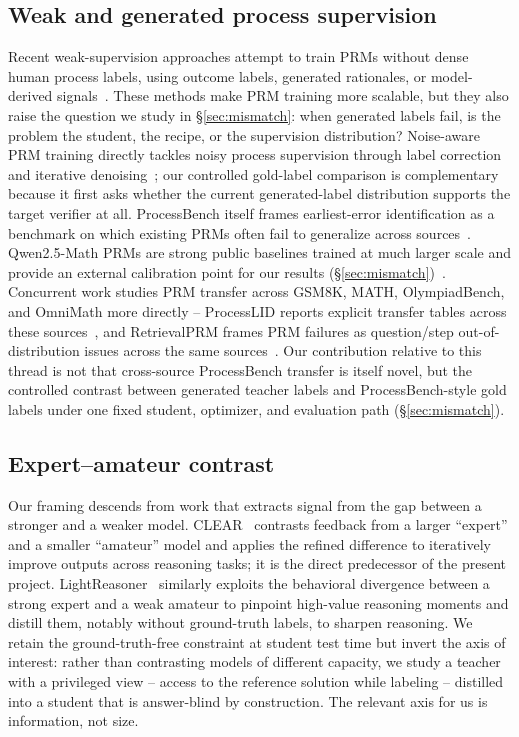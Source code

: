 \documentclass[11pt]{article}
\begin{document}
\subsection{Weak and generated process supervision}
\label{sec:related-weak}
Recent weak-supervision approaches attempt to train PRMs without dense human
process labels, using outcome labels, generated rationales, or model-derived
signals~\cite{sun2025freeprm}. These methods make PRM training more
scalable, but they also raise the question we study in
\S\ref{sec:mismatch}: when generated labels fail, is the problem the
student, the recipe, or the supervision distribution? Noise-aware PRM
training directly tackles noisy process supervision through label correction
and iterative denoising~\cite{xie2026noiseaware}; our controlled gold-label
comparison is complementary because it first asks whether the current
generated-label distribution supports the target verifier at all. ProcessBench itself
frames earliest-error identification as a benchmark on which existing PRMs
often fail to generalize across sources~\cite{zheng2024processbench}.
Qwen2.5-Math PRMs are strong public baselines trained at much larger scale
and provide an external calibration point for our results
(\S\ref{sec:mismatch})~\cite{zhang2025qwenmathprm,qwen25mathprm800k}.
Concurrent work studies PRM transfer across GSM8K, MATH, OlympiadBench, and
OmniMath more directly -- ProcessLID reports explicit transfer tables across
these sources~\cite{bai2026processlid}, and RetrievalPRM frames PRM failures
as question/step out-of-distribution issues across the same
sources~\cite{zhu2025retrievalprm}. Our contribution relative to this thread
is not that cross-source ProcessBench transfer is itself novel, but the
controlled contrast between generated teacher labels and ProcessBench-style
gold labels under one fixed student, optimizer, and evaluation path
(\S\ref{sec:mismatch}).

\subsection{Expert--amateur contrast}
Our framing descends from work that extracts signal from the gap between a
stronger and a weaker model. CLEAR~\cite{rufail2025clear} contrasts feedback
from a larger ``expert'' and a smaller ``amateur'' model and applies the
refined difference to iteratively improve outputs across reasoning tasks; it
is the direct predecessor of the present project. LightReasoner~\cite{wang2025lightreasoner}
similarly exploits the behavioral divergence between a strong expert and a
weak amateur to pinpoint high-value reasoning moments and distill them,
notably without ground-truth labels, to sharpen reasoning. We retain the
ground-truth-free constraint at student test time but invert the axis of
interest: rather than contrasting models of different capacity, we study a
teacher with a privileged view -- access to the reference solution while
labeling -- distilled into a student that is answer-blind by construction.
The relevant axis for us is information, not size.
\end{document}
